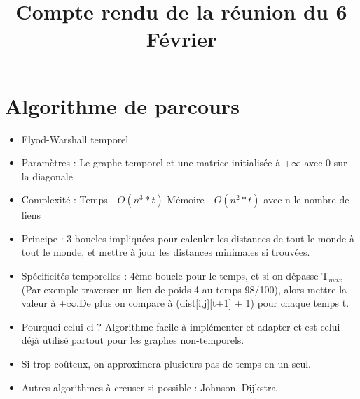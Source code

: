 \documentclass{article}
\title{Compte rendu de la réunion du 6 Février}
\date{}
\begin{document}
	
\maketitle
	
\section*{Algorithme de parcours}
	\begin{itemize}
		\item  Flyod-Warshall temporel
		\item Paramètres : Le graphe temporel et une matrice initialisée à +${\infty}$ avec 0
		sur la diagonale
		\item Complexité : Temps - ${O(n^3 * t)}$ Mémoire - ${O(n^2 * t)}$ avec n le nombre de liens
		\item Principe : 3 boucles impliquées pour calculer les distances de tout le monde à tout le monde, et mettre à jour les distances minimales si trouvées.
		\item Spécificités temporelles : 4ème boucle pour le temps, et si on dépasse T${_{max}}$ (Par exemple traverser un lien de poids 4 au temps 98/100), alors mettre la valeur à +${\infty}$.\newline De plus on compare à (dist[i,j][t+1] + 1) pour chaque temps t.
		\item Pourquoi celui-ci ? Algorithme facile à implémenter et adapter et est celui
		déjà utilisé partout pour les graphes non-temporels.
		\item Si trop coûteux, on approximera plusieurs pas de temps en un seul.
		\item Autres algorithmes à creuser si possible : Johnson, Dijkstra
	\end{itemize}
	
\newpage
	
\end{document}
